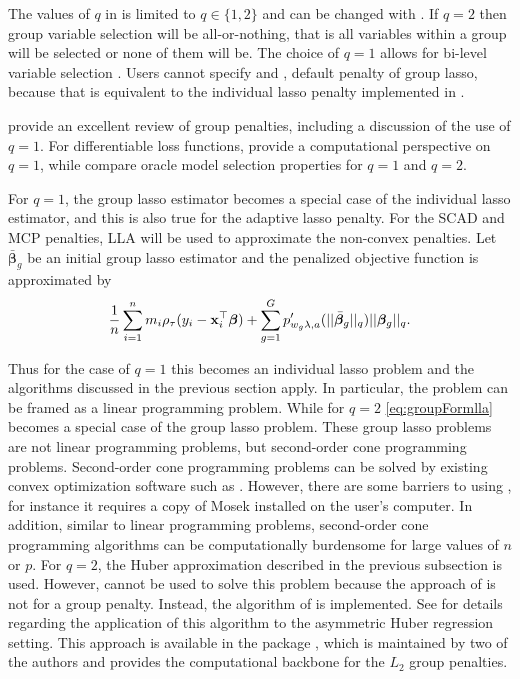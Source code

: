 The values of \(q\) in  is limited to \(q \in \{1,2\}\) and can be changed with . If \(q=2\) then group variable selection will be all-or-nothing, that is all variables within a group will be selected or none of them will be. The choice of \(q=1\) allows for bi-level variable selection \citep{penBiLevel}. Users cannot specify  and , default penalty of group lasso, because that is equivalent to the individual lasso penalty implemented in .

\citet{groupReview} provide an excellent review of group penalties, including a discussion of the use of \(q=1\). For differentiable loss functions, \citet{penBiLevel} provide a computational perspective on \(q=1\), while \citet{mestatp} compare oracle model selection properties for \(q=1\) and \(q=2\).

For \(q=1\), the group lasso estimator becomes a special case of the individual lasso estimator, and this is also true for the adaptive lasso penalty. For the SCAD and MCP penalties, LLA will be used to approximate the non-convex penalties. Let \(\bar{\bm \beta}_g\) be an initial group lasso estimator and the penalized objective function is approximated by
\begin{equation}
\frac{1}{n} \sum_{i=1}^n m_i \rho_\tau(y_i - {\bf x}_i^\top\bm \beta) + \sum_{g=1}^G p'_{w_g\lambda,a}(||\bar{\bm \beta}_g||_q)||\bm \beta_g||_q.
\label{eq:groupFormlla}
\end{equation}

Thus for the case of \(q=1\) this becomes an individual lasso problem and the algorithms discussed in the previous section apply. In particular, the problem can be framed as a linear programming problem. While for \(q=2\) \eqref{eq:groupFormlla} becomes a special case of the group lasso problem. These group lasso problems are not linear programming problems, but second-order cone programming problems. Second-order cone programming problems can be solved by existing convex optimization software such as  \citep{JSSv060i05}. However, there are some barriers to using , for instance it requires a copy of Mosek installed on the user's computer. In addition, similar to linear programming problems, second-order cone programming algorithms can be computationally burdensome for large values of \(n\) or \(p\). For \(q=2\), the Huber approximation described in the previous subsection is used. However,  cannot be used to solve this problem because the approach of \citet{huber_cd} is not for a group penalty. Instead, the algorithm of \citet{Yang2015} is implemented. See \citet{SherwoodLi2022} for details regarding the application of this algorithm to the asymmetric Huber regression setting. This approach is available in the package , which is maintained by two of the authors and provides the computational backbone for the \(L_2\) group penalties.

